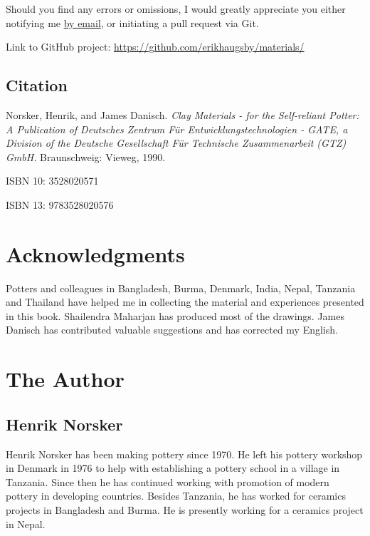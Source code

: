 Should you find any errors or omissions, I would greatly appreciate you either 
notifying me \href{mailto:e@erikhaugsby.com}{by email}, or initiating a pull 
request via Git. 

Link to GitHub project: 
\href{https://github.com/erikhaugsby/materials/}{https://github.com/erikhaugsby/materials/}
\subsection*{Citation}

Norsker, Henrik, and James Danisch. \textit{Clay Materials - for the 
  Self-reliant Potter: A Publication of Deutsches Zentrum F\"{u}r 
  Entwicklungstechnologien - GATE, a Division of the Deutsche Gesellschaft 
  F\"{u}r Technische Zusammenarbeit (GTZ) GmbH.} Braunschweig: Vieweg, 1990.

ISBN 10: 3528020571

ISBN 13: 9783528020576
\newpage
\section*{Acknowledgments}
Potters and colleagues in Bangladesh, Burma, Denmark, India, Nepal, Tanzania 
and Thailand have helped me in collecting the material and experiences 
presented in this book. Shailendra Maharjan has produced most of the drawings. 
James Danisch has contributed valuable suggestions and has corrected my English.
\section*{The Author}
\subsection*{Henrik Norsker} 
Henrik Norsker has been making pottery since 1970. He left his pottery workshop 
in Denmark in 1976 to help with establishing a pottery school in a village in 
Tanzania. Since then he has continued working with promotion of modern pottery 
in developing countries. Besides Tanzania, he has worked for ceramics projects 
in Bangladesh and Burma. He is presently working for a ceramics project in 
Nepal.
